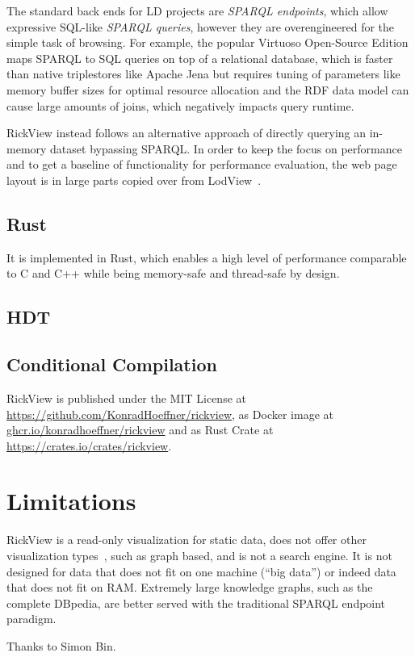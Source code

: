 \documentclass{ceurart}
\begin{document}
The standard back ends for LD projects are \emph{SPARQL endpoints}, which allow expressive SQL-like \emph{SPARQL queries}, however they are overengineered for the simple task of browsing.
For example, the popular Virtuoso Open-Source Edition maps SPARQL to SQL queries on top of a relational database, which is faster than native triplestores like Apache Jena but requires tuning of parameters like memory buffer sizes for optimal resource allocation and the RDF data model can cause large amounts of joins, which negatively impacts query runtime.

RickView instead follows an alternative approach of directly querying an in-memory dataset bypassing SPARQL.
In order to keep the focus on performance and to get a baseline of functionality for performance evaluation, the web page layout is in large parts copied
over from LodView~\citep{lodview,adaptinglodview}.
%
%
\subsection{Rust}
It is implemented in Rust, which enables a high level of performance comparable to C and C++ while being memory-safe and thread-safe by design.

\subsection{HDT}\label{sec:hdt}

\subsection{Conditional Compilation}


RickView is published under the MIT License at \url{https://github.com/KonradHoeffner/rickview}, as Docker image at \url{ghcr.io/konradhoeffner/rickview} and as Rust Crate at \url{https://crates.io/crates/rickview}.

\section{Limitations}
RickView is a read-only visualization for static data, does not offer other visualization types~\citep{linkeddatavisualization}, such as graph based, and is not a search engine.
It is not designed for data that does not fit on one machine (\enquote{big data}) or indeed data that does not fit on RAM.
Extremely large knowledge graphs, such as the complete DBpedia, are better served with the traditional SPARQL endpoint paradigm.


\begin{acknowledgments}
Thanks to Simon Bin.
\end{acknowledgments}
%
%

\end{document}
